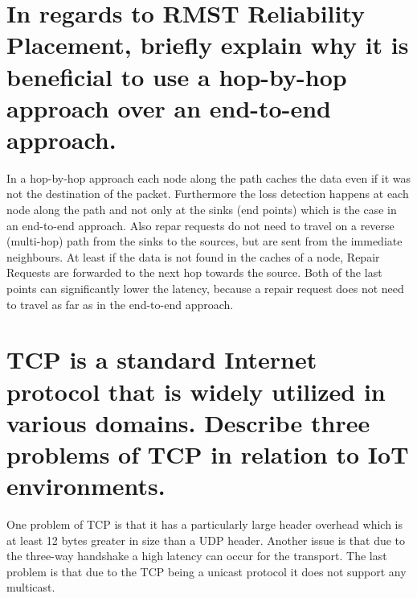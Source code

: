 \documentclass{report}
\begin{document}
	\section{In regards to RMST Reliability Placement, briefly explain why it is beneficial to use a hop-by-hop approach over an end-to-end approach.}
	\startsection
		In a hop-by-hop approach each node along the path caches the data even if it was not the destination of the packet. Furthermore the loss detection happens at each node along the path and not only at the sinks (end points) which is the case in an end-to-end approach. Also repar requests do not need to travel on a reverse (multi-hop) path from the sinks to the sources, but are sent from the immediate neighbours. At least if the data is not found in the caches of a node, Repair Requests are forwarded to the next hop towards the source. Both of the last points can significantly lower the latency, because a repair request does not need to travel as far as in the end-to-end approach.
	\closesection
	
	\section{TCP is a standard Internet protocol that is widely utilized in various domains. Describe three problems of TCP in relation to IoT environments.}
	\startsection
		One problem of TCP is that it has a particularly large header overhead which is at least 12 bytes greater in size than a UDP header. Another issue is that due to the three-way handshake a high latency can occur for the transport. The last problem is that due to the TCP being a unicast protocol it does not support any multicast.
	\closesection
\end{document}
